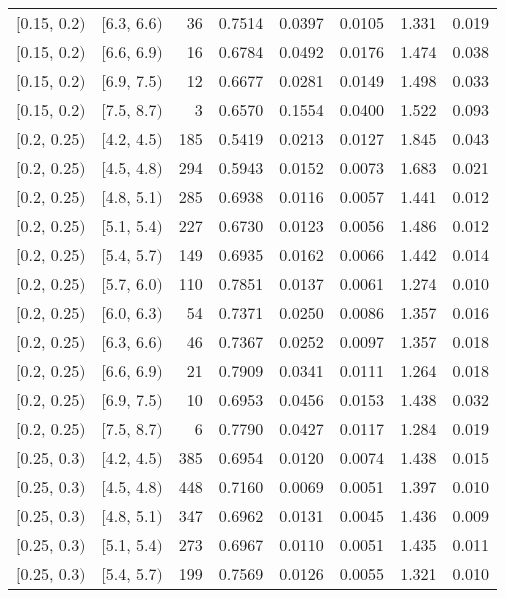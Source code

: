 \begin{longtable}{| l | l | r | r | r | r | r | r |}
        $[$0.15, 0.2$)$ & $[$6.3, 6.6$)$ & 36 & 0.7514 & 0.0397 & 0.0105 & 1.331 & 0.019 \\
        $[$0.15, 0.2$)$ & $[$6.6, 6.9$)$ & 16 & 0.6784 & 0.0492 & 0.0176 & 1.474 & 0.038 \\
        $[$0.15, 0.2$)$ & $[$6.9, 7.5$)$ & 12 & 0.6677 & 0.0281 & 0.0149 & 1.498 & 0.033 \\
        $[$0.15, 0.2$)$ & $[$7.5, 8.7$)$ & 3 & 0.6570 & 0.1554 & 0.0400 & 1.522 & 0.093 \\
        $[$0.2, 0.25$)$ & $[$4.2, 4.5$)$ & 185 & 0.5419 & 0.0213 & 0.0127 & 1.845 & 0.043 \\
        $[$0.2, 0.25$)$ & $[$4.5, 4.8$)$ & 294 & 0.5943 & 0.0152 & 0.0073 & 1.683 & 0.021 \\
        $[$0.2, 0.25$)$ & $[$4.8, 5.1$)$ & 285 & 0.6938 & 0.0116 & 0.0057 & 1.441 & 0.012 \\
        $[$0.2, 0.25$)$ & $[$5.1, 5.4$)$ & 227 & 0.6730 & 0.0123 & 0.0056 & 1.486 & 0.012 \\
        $[$0.2, 0.25$)$ & $[$5.4, 5.7$)$ & 149 & 0.6935 & 0.0162 & 0.0066 & 1.442 & 0.014 \\
        $[$0.2, 0.25$)$ & $[$5.7, 6.0$)$ & 110 & 0.7851 & 0.0137 & 0.0061 & 1.274 & 0.010 \\
        $[$0.2, 0.25$)$ & $[$6.0, 6.3$)$ & 54 & 0.7371 & 0.0250 & 0.0086 & 1.357 & 0.016 \\
        $[$0.2, 0.25$)$ & $[$6.3, 6.6$)$ & 46 & 0.7367 & 0.0252 & 0.0097 & 1.357 & 0.018 \\
        $[$0.2, 0.25$)$ & $[$6.6, 6.9$)$ & 21 & 0.7909 & 0.0341 & 0.0111 & 1.264 & 0.018 \\
        $[$0.2, 0.25$)$ & $[$6.9, 7.5$)$ & 10 & 0.6953 & 0.0456 & 0.0153 & 1.438 & 0.032 \\
        $[$0.2, 0.25$)$ & $[$7.5, 8.7$)$ & 6 & 0.7790 & 0.0427 & 0.0117 & 1.284 & 0.019 \\
        $[$0.25, 0.3$)$ & $[$4.2, 4.5$)$ & 385 & 0.6954 & 0.0120 & 0.0074 & 1.438 & 0.015 \\
        $[$0.25, 0.3$)$ & $[$4.5, 4.8$)$ & 448 & 0.7160 & 0.0069 & 0.0051 & 1.397 & 0.010 \\
        $[$0.25, 0.3$)$ & $[$4.8, 5.1$)$ & 347 & 0.6962 & 0.0131 & 0.0045 & 1.436 & 0.009 \\
        $[$0.25, 0.3$)$ & $[$5.1, 5.4$)$ & 273 & 0.6967 & 0.0110 & 0.0051 & 1.435 & 0.011 \\
        $[$0.25, 0.3$)$ & $[$5.4, 5.7$)$ & 199 & 0.7569 & 0.0126 & 0.0055 & 1.321 & 0.010 \\

\end{longtable}
